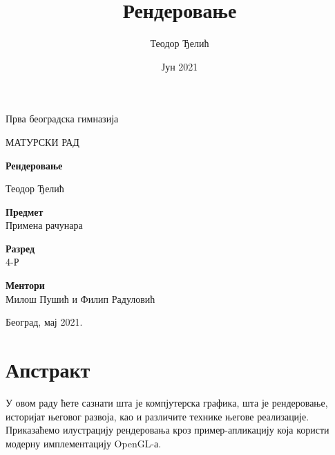\documentclass[12pt]{article}
\title{Рендеровање}
\author{Теодор Ђелић}
\date{Јун 2021}
\begin{document}
	\begin{titlepage}
		\begin{center}
			\vspace*{1cm}
			
			\large
			Прва београдска гимназија\\
			
			\vspace{0.5cm}
			
			\LARGE
			
			МАТУРСКИ РАД\\
			
			
			\vspace{1cm}
			
			\Huge
			\textbf{Рендеровање}
			
			\vspace{0.5cm}
			
			\LARGE
			Теодор Ђелић
			
			\vspace{1cm}
			
			\Large
			\textbf{Предмет}\\
			\Large
			Примена рачунара\\
			
			\vspace{0.5cm}
			
			\Large
			\textbf{Разред}\\
			\Large
			4-Р\\
			
			\vspace{0.5cm}
			
			\Large
			\textbf{Ментори}\\
			\Large
			Милош Пушић и Филип Радуловић\\
			
			
			\vfill
			
			\vspace{0.8cm}
			
			\large
			
			Београд, мај 2021.\\
			
		\end{center}
	\end{titlepage}
	
	\tableofcontents
	
	\pagebreak
	
	\section*{Апстракт}
	У овом раду ћете сазнати шта је компјутерска графика, шта је рендеровање, историјат његовог развоја, као и различите технике његове реализације. Приказаћемо илустрацију рендеровања кроз пример-апликацију која користи модерну имплементацију OpenGL-а.
	
\end{document}
